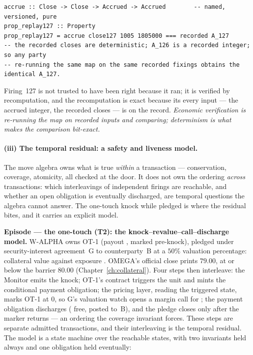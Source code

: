 \begin{lstlisting}
accrue :: Close -> Close -> Accrued -> Accrued        -- named, versioned, pure
prop_replay127 :: Property
prop_replay127 = accrue close127 1005 1805000 === recorded A_127
-- the recorded closes are deterministic; A_126 is a recorded integer; so any party
-- re-running the same map on the same recorded fixings obtains the identical A_127.
\end{lstlisting}

Firing~127 is not trusted to have been right because it ran; it is verified by
recomputation, and the recomputation is exact because its every input --- the accrued
integer, the recorded closes --- is on the record. \emph{Economic verification is re-running
the map on recorded inputs and comparing; determinism is what makes the comparison
bit-exact.}

\paragraph{(iii) The temporal residual: a safety and liveness model.}
The move algebra owns what is true \emph{within} a transaction --- conservation, coverage,
atomicity, all checked at the door. It does not own the ordering \emph{across} transactions:
which interleavings of independent firings are reachable, and whether an open obligation is
eventually discharged, are temporal questions the algebra cannot answer. The one-touch knock
while pledged is where the residual bites, and it carries an explicit model.

\medskip\noindent\textbf{Episode --- the one-touch (T2): the knock--revalue--call--discharge
model.}
W-ALPHA owns OT-1 (payout , marked  pre-knock), pledged
under security-interest agreement~G to counterparty~B at a $50\%$ valuation percentage:
collateral value  against exposure . OMEGA's official close
prints $79.00$, at or below the barrier $80.00$ (Chapter~\ref{ch:collateral}). Four steps
then interleave: the Monitor emits the knock; OT-1's contract triggers the unit and mints the
conditional payment obligation; the pricing layer, reading the triggered state, marks OT-1 at
$0$, so G's valuation watch opens a margin call for ; the payment obligation
discharges  ( free,  posted to~B), and the
pledge closes only after the marker returns --- an ordering the coverage invariant forces.
These steps are separate admitted transactions, and their interleaving is the temporal
residual. The model is a state machine over the reachable states, with two invariants held
always and one obligation held eventually:

